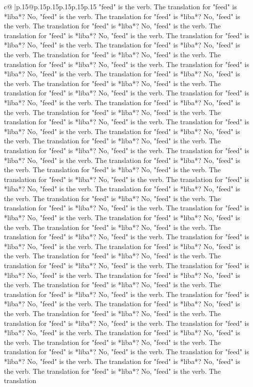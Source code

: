 \documentclass{article}
\begin{document}
{\begin{supertabular}{c@{$\;$}|p{.15\linewidth}@{}p{.15\linewidth}p{.15\linewidth}p{.15\linewidth}p{.15\linewidth}p{.15\linewidth}}
{{{"feed" is the verb. The translation for "feed" is *liba*? No, "feed" is the verb. The translation for "feed" is *liba*? No, "feed" is the verb. The translation for "feed" is *liba*? No, "feed" is the verb. The translation for "feed" is *liba*? No, "feed" is the verb. The translation for "feed" is *liba*? No, "feed" is the verb. The translation for "feed" is *liba*? No, "feed" is the verb. The translation for "feed" is *liba*? No, "feed" is the verb. The translation for "feed" is *liba*? No, "feed" is the verb. The translation for "feed" is *liba*? No, "feed" is the verb. The translation for "feed" is *liba*? No, "feed" is the verb. The translation for "feed" is *liba*? No, "feed" is the verb. The translation for "feed" is *liba*? No, "feed" is the verb. The translation for "feed" is *liba*? No, "feed" is the verb. The translation for "feed" is *liba*? No, "feed" is the verb. The translation for "feed" is *liba*? No, "feed" is the verb. The translation for "feed" is *liba*? No, "feed" is the verb. The translation for "feed" is *liba*? No, "feed" is the verb. The translation for "feed" is *liba*? No, "feed" is the verb. The translation for "feed" is *liba*? No, "feed" is the verb. The translation for "feed" is *liba*? No, "feed" is the verb. The translation for "feed" is *liba*? No, "feed" is the verb. The translation for "feed" is *liba*? No, "feed" is the verb. The translation for "feed" is *liba*? No, "feed" is the verb. The translation for "feed" is *liba*? No, "feed" is the verb. The translation for "feed" is *liba*? No, "feed" is the verb. The translation for "feed" is *liba*? No, "feed" is the verb. The translation for "feed" is *liba*? No, "feed" is the verb. The translation for "feed" is *liba*? No, "feed" is the verb. The translation for "feed" is *liba*? No, "feed" is the verb. The translation for "feed" is *liba*? No, "feed" is the verb. The translation for "feed" is *liba*? No, "feed" is the verb. The translation for "feed" is *liba*? No, "feed" is the verb. The translation for "feed" is *liba*? No, "feed" is the verb. The translation for "feed" is *liba*? No, "feed" is the verb. The translation for "feed" is *liba*? No, "feed" is the verb. The translation for "feed" is *liba*? No, "feed" is the verb. The translation for "feed" is *liba*? No, "feed" is the verb. The translation for "feed" is *liba*? No, "feed" is the verb. The translation for "feed" is *liba*? No, "feed" is the verb. The translation for "feed" is *liba*? No, "feed" is the verb. The translation for "feed" is *liba*? No, "feed" is the verb. The translation for "feed" is *liba*? No, "feed" is the verb. The translation for "feed" is *liba*? No, "feed" is the verb. The translation for "feed" is *liba*? No, "feed" is the verb. The translation for "feed" is *liba*? No, "feed" is the verb. The translation for "feed" is *liba*? No, "feed" is the verb. The translation for "feed" is *liba*? No, "feed" is the verb. The translation for "feed" is *liba*? No, "feed" is the verb. The translation for "feed" is *liba*? No, "feed" is the verb. The translation for "feed" is *liba*? No, "feed" is the verb. The translation for "feed" is *liba*? No, "feed" is the verb. The translation }}}
\end{supertabular}}
\end{document}
